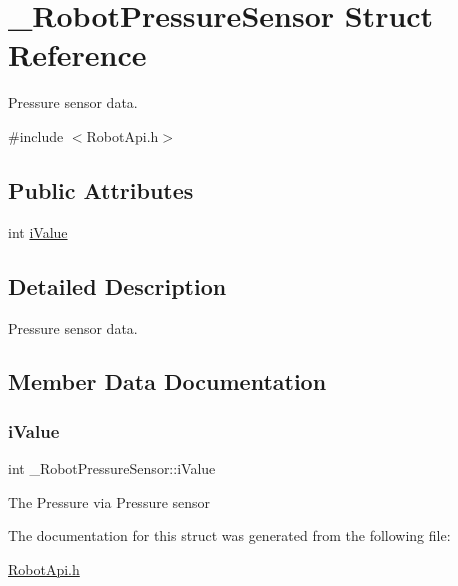 \hypertarget{struct__RobotPressureSensor}{}\section{\+\_\+\+Robot\+Pressure\+Sensor Struct Reference}
\label{struct__RobotPressureSensor}


Pressure sensor data.  




{\ttfamily \#include $<$Robot\+Api.\+h$>$}

\subsection*{Public Attributes}
\begin{DoxyCompactItemize}
\item 
int \hyperlink{struct__RobotPressureSensor_aa8cde267cdbc78067d0589e15e9fb15d}{i\+Value}
\end{DoxyCompactItemize}


\subsection{Detailed Description}
Pressure sensor data. 

\subsection{Member Data Documentation}
\mbox{\label{struct__RobotPressureSensor_aa8cde267cdbc78067d0589e15e9fb15d}} 
\subsubsection{\texorpdfstring{i\+Value}{iValue}}
{\footnotesize\ttfamily int \+\_\+\+Robot\+Pressure\+Sensor\+::i\+Value}

The Pressure via Pressure sensor 

The documentation for this struct was generated from the following file\+:\begin{DoxyCompactItemize}
\item 
\hyperlink{RobotApi_8h}{Robot\+Api.\+h}\end{DoxyCompactItemize}
